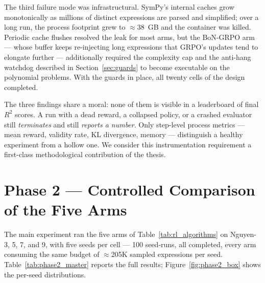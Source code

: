 The third failure mode was infrastructural. SymPy's internal caches grow monotonically as millions of distinct expressions are parsed and simplified; over a long run, the process footprint grew to $\approx$38~GB and the container was killed. Periodic cache flushes resolved the leak for most arms, but the BoN-GRPO arm --- whose buffer keeps re-injecting long expressions that GRPO's updates tend to elongate further --- additionally required the complexity cap and the anti-hang watchdog described in Section~\ref{sec:guards} to become executable on the polynomial problems. With the guards in place, all twenty cells of the design completed.

The three findings share a moral: none of them is visible in a leaderboard of final $R^2$ scores. A run with a dead reward, a collapsed policy, or a crashed evaluator still \emph{terminates} and still \emph{reports a number}. Only step-level process metrics --- mean reward, validity rate, KL divergence, memory --- distinguish a healthy experiment from a hollow one. We consider this instrumentation requirement a first-class methodological contribution of the thesis.

\section{Phase 2 --- Controlled Comparison of the Five Arms}
\label{sec:phase2_results}

The main experiment ran the five arms of Table~\ref{tab:rl_algorithms} on Nguyen-3, 5, 7, and 9, with five seeds per cell --- 100 seed-runs, all completed, every arm consuming the same budget of $\approx$205K sampled expressions per seed. Table~\ref{tab:phase2_master} reports the full results; Figure~\ref{fig:phase2_box} shows the per-seed distributions.

